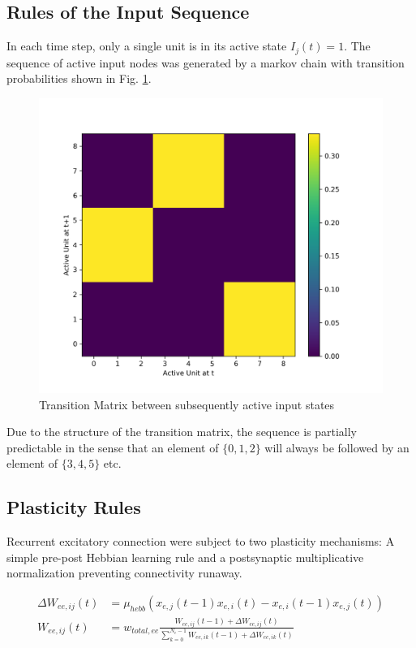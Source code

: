 \documentclass[10pt,a4paper]{article}
\begin{document}
\subsection{Rules of the Input Sequence}

In each time step, only a single unit is in its active state $I_j(t) = 1$. The sequence of active input nodes was generated by a markov chain with transition probabilities shown in Fig. \ref{fig:grammar_markov}.

\begin{figure}
\includegraphics[width=\textwidth]{../plots/Grammar_Markov.png}
\caption{\label{fig:grammar_markov} Transition Matrix between subsequently active input states}
\end{figure}

Due to the structure of the transition matrix, the sequence is partially predictable in the sense that an element of $\{0,1,2\}$ will always be followed by an element of $\{3,4,5\}$ etc.

\subsection{Plasticity Rules}

Recurrent excitatory connection were subject to two plasticity mechanisms: A simple pre-post Hebbian learning rule and a postsynaptic multiplicative normalization preventing connectivity runaway.

\begin{align}
\Delta W_{ee,ij}(t) &= \mu_{hebb} \left( x_{e,j}(t-1)x_{e,i}(t) - x_{e,i}(t-1)x_{e,j}(t) \right) \\
W_{ee,ij}(t) &= w_{total,ee}\frac{W_{ee,ij}(t-1) + \Delta W_{ee,ij}(t)}{\sum_{k=0}^{N_e - 1} W_{ee,ik}(t-1) + \Delta W_{ee,ik}(t)}
\end{align}
\end{document}
